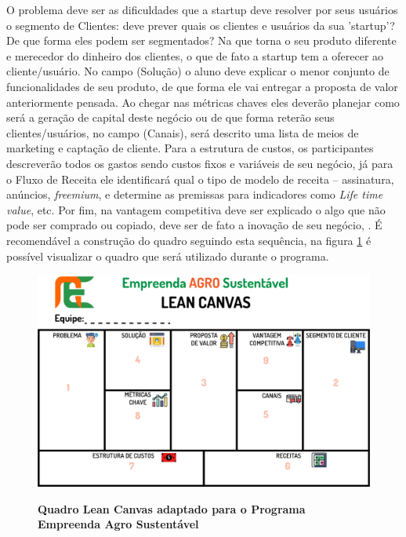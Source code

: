 O problema deve ser as dificuldades que a startup deve resolver por seus usuários o segmento de Clientes: deve prever quais os clientes e usuários da sua 'startup'? De que forma eles podem ser segmentados? Na que torna o seu produto diferente e merecedor do dinheiro dos clientes, o que de fato a startup tem a oferecer ao cliente/usuário. No campo (Solução) o aluno deve explicar o menor conjunto de funcionalidades de seu produto, de que forma ele vai entregar a proposta de valor anteriormente pensada. Ao chegar nas métricas chaves eles deverão planejar como será a geração de capital deste negócio ou de que forma reterão seus clientes/usuários, no campo (Canais), será descrito uma lista de meios de marketing e captação de cliente. Para a estrutura de custos, os participantes descreverão todos os gastos sendo custos fixos e variáveis de seu negócio, já para o Fluxo de Receita ele identificará qual o tipo de modelo de receita – assinatura, anúncios, \textit{freemium}, e determine as premissas para indicadores como \textit{Life time value}, etc. Por fim, na vantagem competitiva deve ser explicado o algo que não pode ser comprado ou copiado, deve ser de fato a inovação de seu negócio, \cite{maurya_running_2012, sebrae_aprenda_2019}. É recomendável a construção do quadro seguindo esta sequência, na figura \ref{figura_7} é possível visualizar o quadro que será utilizado durante o programa. 



\begin{figure}[h!]
\centering
\caption{\textbf{Quadro Lean Canvas adaptado para o Programa Empreenda Agro Sustentável}}
\includegraphics[scale=0.4]{Imagens/canvas.png}
\label{figura_7}
\end{figure}
\newpage

